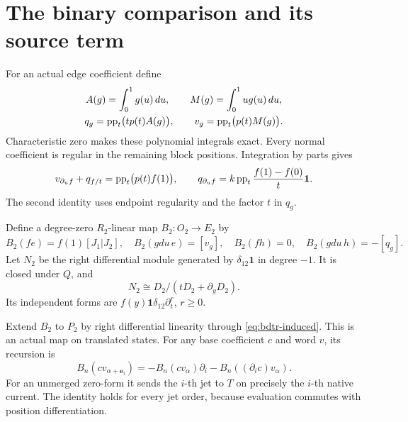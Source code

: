 \section{The binary comparison and its source term}

For an actual edge coefficient define
\begin{equation}\label{eq:bdtr-integrals}
 \begin{gathered}
 A(g)=\int_0^1g(u)\,du,
 \qquad M(g)=\int_0^1ug(u)\,du,\\
 q_g=\operatorname{pp}_t\bigl(t p(t)A(g)\bigr),
 \qquad v_g=\operatorname{pp}_t\bigl(p(t)M(g)\bigr).
 \end{gathered}
\end{equation}
Characteristic zero makes these polynomial integrals exact.
Every normal coefficient is regular in the remaining block positions.
Integration by parts gives
\begin{equation}\label{eq:bdtr-endpoint}
 v_{\partial_uf}+q_{f/t}=\operatorname{pp}_t\bigl(p(t)f(1)\bigr),
 \qquad q_{\partial_uf}
 =k\operatorname{pp}_t\frac{f(1)-f(0)}t\mathbf1.
\end{equation}
The second identity uses endpoint regularity and the factor $t$ in $q_g$.

Define a degree-zero $R_2$-linear map $B_2:O_2\to E_2$ by
\[
 B_2(fe)=f(1)[J_1|J_2],\quad
 B_2(gdu\,e)=[v_g],\quad
 B_2(fh)=0,\quad B_2(gdu\,h)=-[q_g].
\]
Let $N_2$ be the right differential module generated by $\delta_{12}\mathbf1$ in degree $-1$.
It is closed under $Q$, and
\begin{equation}\label{eq:bdtr-binary-module}
 N_2\cong D_2/(tD_2+\partial_yD_2).
\end{equation}
Its independent forms are $f(y)\mathbf1\delta_{12}\partial_t^r$, $r\geq0$.

Extend $B_2$ to $P_2$ by right differential linearity through \eqref{eq:bdtr-induced}.
This is an actual map on translated states.
For any base coefficient $c$ and word $v$, its recursion is
\begin{equation}\label{eq:bdtr-B-recursion}
 B_n(cv_{\alpha+\mathbf e_i})
 =-B_n(cv_\alpha)\partial_i-B_n((\partial_ic)v_\alpha).
\end{equation}
For an unmerged zero-form it sends the $i$-th jet to $T$ on precisely the $i$-th native current.
The identity holds for every jet order, because evaluation commutes with position differentiation.

